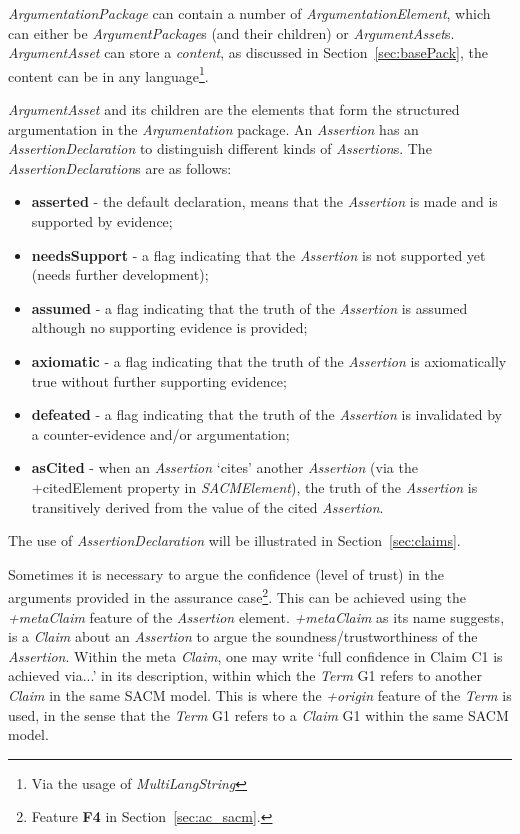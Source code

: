 \textit{ArgumentationPackage} can contain a number of \textit{ArgumentationElement}, which can either be \textit{ArgumentPackage}s (and their children) or \textit{ArgumentAsset}s. 
\textit{ArgumentAsset} can store a \textit{content}, as discussed in Section~\ref{sec:basePack}, the content can be in any language\footnote{Via the usage of \textit{MultiLangString}}.

\textit{ArgumentAsset} and its children are the elements that form the structured argumentation in the \textit{Argumentation} package. 
An \textit{Assertion} has an \textit{AssertionDeclaration} to distinguish different kinds of \textit{Assertion}s. 
The \textit{AssertionDeclaration}s are as follows: 

\begin{itemize}
	\item \textbf{asserted} - the default declaration, means that the \textit{Assertion} is made and is supported by evidence;
	\item \textbf{needsSupport} - a flag indicating that the \textit{Assertion} is not supported yet (needs further development);
	\item \textbf{assumed} - a flag indicating that the truth of the \textit{Assertion} is assumed although no supporting evidence is provided;
	\item \textbf{axiomatic} - a flag indicating that the truth of the \textit{Assertion} is axiomatically true without further supporting evidence;
	\item \textbf{defeated} - a flag indicating that the truth of the \textit{Assertion} is invalidated by a counter-evidence and/or argumentation;
	\item \textbf{asCited} - when an \textit{Assertion} `cites' another \textit{Assertion} (via the +citedElement property in \textit{SACMElement}), the truth of the \textit{Assertion} is transitively derived from the value of the cited \textit{Assertion}.
\end{itemize}

The use of \textit{AssertionDeclaration} will be illustrated in Section~\ref{sec:claims}.

Sometimes it is necessary to argue the confidence (level of trust) in the arguments provided in the assurance case\footnote{Feature \textbf{F4} in Section~\ref{sec:ac_sacm}.}. 
This can be achieved using the \textit{+metaClaim} feature of the \textit{Assertion} element. 
\textit{+metaClaim} as its name suggests, is a \textit{Claim} about an \textit{Assertion} to argue the soundness/trustworthiness of the \textit{Assertion}. 
Within the meta \textit{Claim}, one may write `full confidence in Claim C1 is achieved via...' in its description, within which the \textit{Term} G1 refers to another \textit{Claim} in the same SACM model. 
This is where the \textit{+origin} feature of the \textit{Term} is used, in the sense that the \textit{Term} G1 refers to a \textit{Claim} G1 within the same SACM model.

